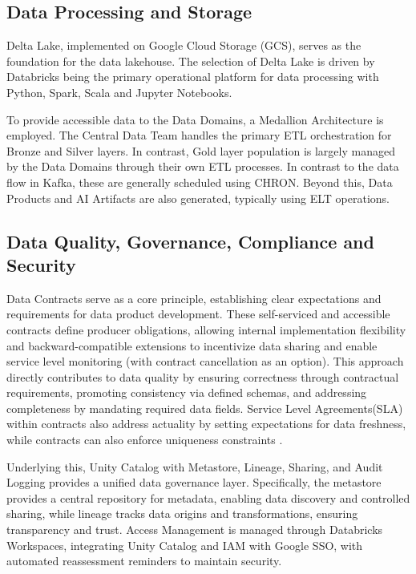 \subsection{Data Processing and Storage}
Delta Lake, implemented on Google Cloud Storage (GCS), serves as the foundation for the data lakehouse. The selection of Delta Lake is driven by Databricks being the primary operational platform for data processing with Python, Spark, Scala and Jupyter Notebooks.

To provide accessible data to the Data Domains, a Medallion Architecture is employed. The Central Data Team handles the primary ETL orchestration for Bronze and Silver layers. In contrast, Gold layer population is largely managed by the Data Domains through their own ETL processes. In contrast to the data flow in Kafka, these are generally scheduled using CHRON. Beyond this, Data Products and AI Artifacts are also generated, typically using ELT operations.

\subsection{Data Quality, Governance, Compliance and Security}
Data Contracts serve as a core principle, establishing clear expectations and requirements for data product development. These self-serviced and accessible contracts define producer obligations, allowing internal implementation flexibility and backward-compatible extensions to incentivize data sharing and enable service level monitoring (with contract cancellation as an option). This approach directly contributes to data quality by ensuring correctness through contractual requirements, promoting consistency via defined schemas, and addressing completeness by mandating required data fields. Service Level Agreements(SLA) within contracts also address actuality by setting expectations for data freshness, while contracts can also enforce uniqueness constraints \parencite{datamesh_governance}.

Underlying this, Unity Catalog with Metastore, Lineage, Sharing, and Audit Logging provides a unified data governance layer. Specifically, the metastore provides a central repository for metadata, enabling data discovery and controlled sharing, while lineage tracks data origins and transformations, ensuring transparency and trust. Access Management is managed through Databricks Workspaces, integrating Unity Catalog and IAM with Google SSO, with automated reassessment reminders to maintain security.

